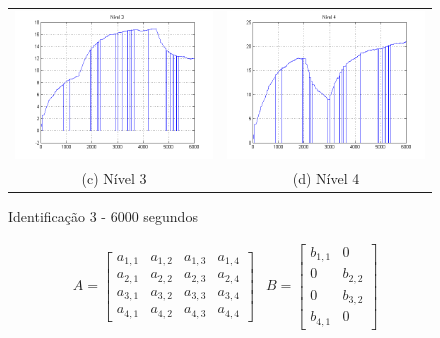 \begin{itemize}
\begin{figure}[H]
\begin{tabular}{cc}
		\includegraphics[height=0.15\paperheight,keepaspectratio]{img/sim3_h3.png} &
		\includegraphics[height=0.15\paperheight,keepaspectratio]{img/sim3_h4.png} \\
		(c) Nível 3 &
		(d) Nível 4
	\end{tabular}
	\caption{\label{imgID_6Results} Identificação 3 - 6000 segundos}
\end{figure}

\begin{align}
	& A =
	\begin{bmatrix}
		a_{1,1} & a_{1,2} & a_{1,3} & a_{1,4} \\
		a_{2,1} & a_{2,2} & a_{2,3} & a_{2,4} \\
		a_{3,1} & a_{3,2} & a_{3,3} & a_{3,4} \\
		a_{4,1} & a_{4,2} & a_{4,3} & a_{4,4}
	\end{bmatrix}
	& B =
	\begin{bmatrix}
		b_{1,1} & 0 \\
		0 & b_{2,2} \\
		0 & b_{3,2} \\
		b_{4,1} & 0
	\end{bmatrix}
\end{align}
\end{itemize}

